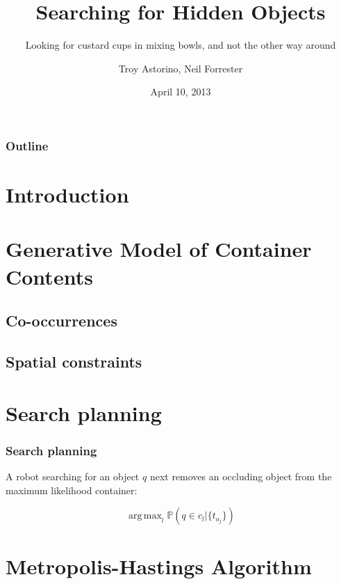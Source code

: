 \documentclass{beamer}
\title{Searching for Hidden Objects}
\subtitle{Looking for custard cups in mixing bowls, and not the other way around}
\author{Troy Astorino, Neil Forrester}
\date{April 10, 2013}
\institute[6.834 -- MIT]{Cognitive Robotics \\ Massachusetts Institute of Technology}
\DeclareMathOperator*{\argmax}{arg\,max}
\begin{document}
\begin{frame}
  \maketitle
\end{frame}

\begin{frame}
  \frametitle{Outline}
  \tableofcontents
\end{frame}

\section{Introduction}



\section{Generative Model of Container Contents}
\subsection{Co-occurrences}






\subsection{Spatial constraints}


\section{Search planning}
\begin{frame}
  \frametitle{Search planning}
  A robot searching for an object $q$ next removes an occluding object
  from the maximum likelihood container:

  \[\argmax_l{\mathbb{P}(q \in c_l|\{t_{o_j}\})}\]
\end{frame}

\section{Metropolis-Hastings Algorithm}

\end{document}
